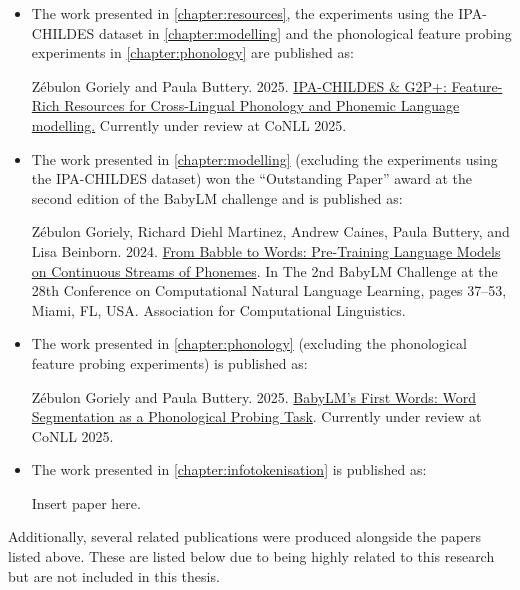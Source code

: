 \begin{itemize}
\item The work presented in \cref{chapter:resources}, the experiments using the IPA-CHILDES dataset in \cref{chapter:modelling} and the phonological feature probing experiments in \cref{chapter:phonology} are published as:

\begin{mdframed}[linewidth=1pt]
Zébulon Goriely and Paula Buttery. 2025. \href{https://arxiv.org/abs/2504.03036}{IPA-CHILDES \& G2P+: Feature-Rich Resources for Cross-Lingual Phonology and Phonemic Language modelling.} Currently under review at CoNLL 2025.
\end{mdframed}

\item The work presented in \cref{chapter:modelling} (excluding the experiments using the IPA-CHILDES dataset) won the ``Outstanding Paper'' award at the second edition of the BabyLM challenge and is published as:

\begin{mdframed}[linewidth=1pt]
Zébulon Goriely, Richard Diehl Martinez, Andrew Caines, Paula Buttery, and Lisa Beinborn. 2024. \href{https://aclanthology.org/2024.conll-babylm.4/#}{From Babble to Words: Pre-Training Language Models on Continuous Streams of Phonemes}. In The 2nd BabyLM Challenge at the 28th Conference on Computational Natural Language Learning, pages 37–53, Miami, FL, USA. Association for Computational Linguistics.
\end{mdframed}

\item The work presented in \cref{chapter:phonology} (excluding the phonological feature probing experiments) is published as:
\begin{mdframed}[linewidth=1pt]
Zébulon Goriely and Paula Buttery. 2025. \href{https://arxiv.org/abs/2504.03338}{BabyLM's First Words: Word Segmentation as a Phonological Probing Task}. Currently under review at CoNLL 2025.
\end{mdframed}

\item The work presented in \cref{chapter:infotokenisation} is published as:
\begin{mdframed}[linewidth=1pt]
Insert paper here.
\end{mdframed}
\end{itemize}

Additionally, several related publications were produced alongside the papers listed above. These are listed below due to being highly related to this research but are not included in this thesis.


